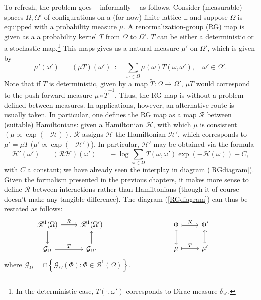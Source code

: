 \documentclass[12pt]{article}
\newcommand{\BB}{\mathscr{B}}
\newcommand{\G}{\mathcal{G}}
\renewcommand{\H}{\mathcal{H}}
\renewcommand{\L}{\mathbb{L}}
\newcommand{\RR}{\mathcal{R}}
\newcommand{\set}[1]{\left\{#1\right\}}
\newcommand{\ra}{\rightarrow}
\newcommand{\pika}{\boldsymbol{\cdot}}
\newcommand{\1}{\mathbbm{1}}
\newcommand{\5}{\vspace{0.5cm}}
\renewcommand{\tilde}{\widetilde}
\theoremstyle{definition}
\begin{document}
To refresh, the problem goes -- informally -- as follows. Consider (measurable) spaces $\Omega,\Omega'$ of configurations on a (for now) finite lattice $\L$ and suppose $\Omega$ is equipped with a probability measure $\mu$. A renormalization-group (RG) map is given as a a probability kernel $T$ from $\Omega$ to $\Omega'$. $T$ can be either a deterministic or a stochastic map.\footnote{In the deterministic case, $T(\pika,\omega')$ corresponds to Dirac measure $\delta_{\omega'}$.} This maps gives us a natural measure $\mu'$ on $\Omega'$, which is given by
$$\mu'(\omega') ~=~ (\mu T)(\omega') ~:=~ \sum_{\omega\in\Omega}\mu(\omega)T(\omega,\omega'), \quad \omega'\in\Omega'.$$
Note that if $T$ is deterministic, given by a map $\tilde{T}:\Omega\ra\Omega'$, $\mu T$ would correspond to the push-forward measure $\mu\circ \tilde{T}^{-1}$. Thus, the RG map is without a problem defined between measures. In applications, however, an alternative route is usually taken. In particular, one defines the RG map as a map $\RR$ between (suitable) Hamiltonians: given a Hamiltonian $\H$, with which $\mu$ is consistent $(\mu\propto \exp(-\H))$, $\RR$ assigns $\H$ the Hamiltonian $\H'$, which corresponds to $\mu'=\mu T$ ($\mu'\propto \exp(-\H')$). In particular, $\H'$ may be obtained via the formula
$$\H'(\omega') ~=~ (\RR\H)(\omega') ~=~ -\log\sum_{\omega\in\Omega} T(\omega,\omega')\exp(-\H(\omega)) + C,$$
with $C$ a constant; we have already seen the interplay in diagram (\ref{RGdiagram}). Given the formalism presented in the previous chapters, it makes more sense to define $\RR$ between interactions rather than Hamiltonians (though it of course doesn't make any tangible difference). The diagram (\ref{RGdiagram}) can thus be restated as follows:
$$\begin{minipage}{0.5\textwidth}
\centering
\begin{tikzcd}
    \BB^1(\Omega) \arrow[r, "\RR"] \arrow[d] & \BB^1(\Omega')  \\
    \G_\Omega \arrow[r, "T"] & \G_{\Omega'} \arrow[u]
\end{tikzcd}
\end{minipage}
\begin{minipage}{0.5\textwidth}
\centering
\begin{tikzcd}
    \Phi \arrow[r, mapsto, "\RR"] \arrow[d, mapsto] & \Phi' \\
    \mu \arrow[r, mapsto, "T"] & \mu' \arrow[u, mapsto]
\end{tikzcd}
\end{minipage}$$
where $\G_\Omega=\cap\set{\G_{\Omega}(\Phi):\Phi\in\BB^1(\Omega)}$. \\
\end{document}

